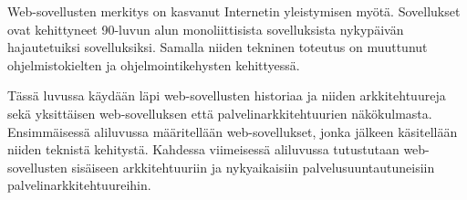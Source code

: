 Web-sovellusten merkitys on kasvanut Internetin yleistymisen myötä. Sovellukset ovat kehittyneet 90-luvun alun monoliittisista sovelluksista nykypäivän hajautetuiksi sovelluksiksi. Samalla niiden tekninen toteutus on muuttunut ohjelmistokielten ja ohjelmointikehysten kehittyessä.

Tässä luvussa käydään läpi web-sovellusten historiaa ja niiden arkkitehtuureja sekä yksittäisen web-sovelluksen että palvelinarkkitehtuurien näkökulmasta. Ensimmäisessä aliluvussa määritellään web-sovellukset, jonka jälkeen käsitellään niiden teknistä kehitystä. Kahdessa viimeisessä aliluvussa tutustutaan web-sovellusten sisäiseen arkkitehtuuriin ja nykyaikaisiin palvelusuuntautuneisiin palvelinarkkitehtuureihin.
